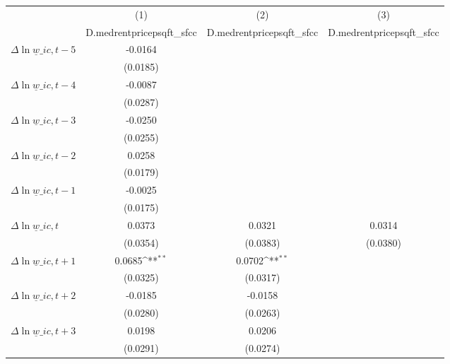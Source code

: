 {
\def\sym#1{\ifmmode^{#1}\else\(^{#1}\)\fi}
\begin{tabular}{l*{3}{c}}
\hline\hline
          &\multicolumn{1}{c}{(1)}&\multicolumn{1}{c}{(2)}&\multicolumn{1}{c}{(3)}\\
          &\multicolumn{1}{c}{D.medrentpricepsqft\_sfcc}&\multicolumn{1}{c}{D.medrentpricepsqft\_sfcc}&\multicolumn{1}{c}{D.medrentpricepsqft\_sfcc}\\
\hline
$\Delta \ln \underline{w}\_{ic,t-5}$&  -0.0164         &                  &                  \\
          & (0.0185)         &                  &                  \\
[1em]
$\Delta \ln \underline{w}\_{ic,t-4}$&  -0.0087         &                  &                  \\
          & (0.0287)         &                  &                  \\
[1em]
$\Delta \ln \underline{w}\_{ic,t-3}$&  -0.0250         &                  &                  \\
          & (0.0255)         &                  &                  \\
[1em]
$\Delta \ln \underline{w}\_{ic,t-2}$&   0.0258         &                  &                  \\
          & (0.0179)         &                  &                  \\
[1em]
$\Delta \ln \underline{w}\_{ic,t-1}$&  -0.0025         &                  &                  \\
          & (0.0175)         &                  &                  \\
[1em]
$\Delta \ln \underline{w}\_{ic,t}$&   0.0373         &   0.0321         &   0.0314         \\
          & (0.0354)         & (0.0383)         & (0.0380)         \\
[1em]
$\Delta \ln \underline{w}\_{ic,t+1}$&   0.0685\sym{**} &   0.0702\sym{**} &                  \\
          & (0.0325)         & (0.0317)         &                  \\
[1em]
$\Delta \ln \underline{w}\_{ic,t+2}$&  -0.0185         &  -0.0158         &                  \\
          & (0.0280)         & (0.0263)         &                  \\
[1em]
$\Delta \ln \underline{w}\_{ic,t+3}$&   0.0198         &   0.0206         &                  \\
          & (0.0291)         & (0.0274)         &                  \\

\end{tabular}}
